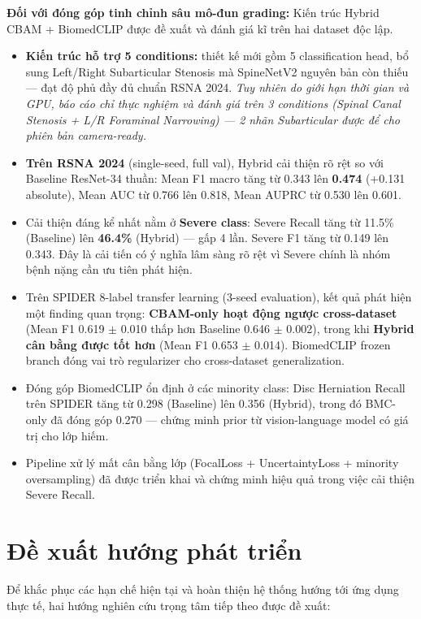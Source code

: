 \textbf{Đối với đóng góp tinh chỉnh sâu mô-đun grading:} Kiến trúc Hybrid CBAM + BiomedCLIP được đề xuất và đánh giá kĩ trên hai dataset độc lập.
    \begin{itemize}
        \item \textbf{Kiến trúc hỗ trợ 5 conditions:} thiết kế mới gồm 5 classification head, bổ sung Left/Right Subarticular Stenosis mà SpineNetV2 nguyên bản còn thiếu --- đạt độ phủ đầy đủ chuẩn RSNA 2024. \emph{Tuy nhiên do giới hạn thời gian và GPU, báo cáo chỉ thực nghiệm và đánh giá trên 3 conditions (Spinal Canal Stenosis + L/R Foraminal Narrowing) --- 2 nhãn Subarticular được để cho phiên bản camera-ready.}
        \item \textbf{Trên RSNA 2024} (single-seed, full val), Hybrid cải thiện rõ rệt so với Baseline ResNet-34 thuần: Mean F1 macro tăng từ 0.343 lên \textbf{0.474} (+0.131 absolute), Mean AUC từ 0.766 lên 0.818, Mean AUPRC từ 0.530 lên 0.601.
        \item Cải thiện đáng kể nhất nằm ở \textbf{Severe class}: Severe Recall tăng từ 11.5\% (Baseline) lên \textbf{46.4\%} (Hybrid) --- gấp 4 lần. Severe F1 tăng từ 0.149 lên 0.343. Đây là cải tiến có ý nghĩa lâm sàng rõ rệt vì Severe chính là nhóm bệnh nặng cần ưu tiên phát hiện.
        \item Trên SPIDER 8-label transfer learning (3-seed evaluation), kết quả phát hiện một finding quan trọng: \textbf{CBAM-only hoạt động ngược cross-dataset} (Mean F1 0.619 $\pm$ 0.010 thấp hơn Baseline 0.646 $\pm$ 0.002), trong khi \textbf{Hybrid cân bằng được tốt hơn} (Mean F1 0.653 $\pm$ 0.014). BiomedCLIP frozen branch đóng vai trò regularizer cho cross-dataset generalization.
        \item Đóng góp BiomedCLIP ổn định ở các minority class: Disc Herniation Recall trên SPIDER tăng từ 0.298 (Baseline) lên 0.356 (Hybrid), trong đó BMC-only đã đóng góp 0.270 --- chứng minh prior từ vision-language model có giá trị cho lớp hiếm.
        \item Pipeline xử lý mất cân bằng lớp (FocalLoss + UncertaintyLoss + minority oversampling) đã được triển khai và chứng minh hiệu quả trong việc cải thiện Severe Recall.
    \end{itemize}
\section{Đề xuất hướng phát triển}
Để khắc phục các hạn chế hiện tại và hoàn thiện hệ thống hướng tới ứng dụng thực tế, hai hướng nghiên cứu trọng tâm tiếp theo được đề xuất:

